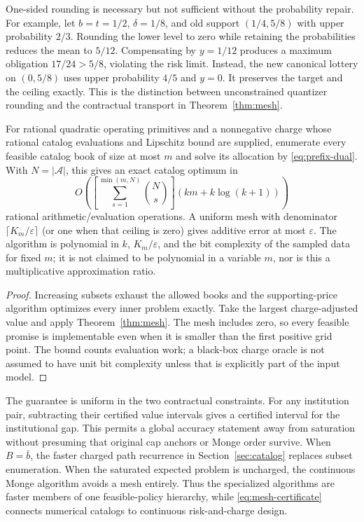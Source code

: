 One-sided rounding is necessary but not sufficient without the probability repair. For example, let $b=t=1/2$, $\delta=1/8$, and old support $(1/4,5/8)$ with upper probability $2/3$. Rounding the lower level to zero while retaining the probabilities reduces the mean to $5/12$. Compensating by $y=1/12$ produces a maximum obligation $17/24>5/8$, violating the risk limit. Instead, the new canonical lottery on $(0,5/8)$ uses upper probability $4/5$ and $y=0$. It preserves the target and the ceiling exactly. This is the distinction between unconstrained quantizer rounding and the contractual transport in Theorem~\ref{thm:mesh}.

\begin{corollary}\label{cor:scheme}
For rational quadratic operating primitives and a nonnegative charge whose rational catalog evaluations and Lipschitz bound are supplied, enumerate every feasible catalog book of size at most $m$ and solve its allocation by \eqref{eq:prefix-dual}. With $N=|\mathcal A|$, this gives an exact catalog optimum in
\begin{equation}\label{eq:catalog-enumeration}
 O\!\left(\left[\sum_{s=1}^{\min(m,N)}{N\choose s}\right]
                (km+k\log(k+1))\right)
\end{equation}
rational arithmetic/evaluation operations. A uniform mesh with denominator $\lceil K_m/\varepsilon\rceil$ (or one when that ceiling is zero) gives additive error at most $\varepsilon$. The algorithm is polynomial in $k$, $K_m/\varepsilon$, and the bit complexity of the sampled data for fixed $m$; it is not claimed to be polynomial in a variable $m$, nor is this a multiplicative approximation ratio.
\end{corollary}
\begin{proof}
Increasing subsets exhaust the allowed books and the supporting-price algorithm optimizes every inner problem exactly. Take the largest charge-adjusted value and apply Theorem~\ref{thm:mesh}. The mesh includes zero, so every feasible promise is implementable even when it is smaller than the first positive grid point. The bound counts evaluation work; a black-box charge oracle is not assumed to have unit bit complexity unless that is explicitly part of the input model.
\end{proof}

The guarantee is uniform in the two contractual constraints. For any institution pair, subtracting their certified value intervals gives a certified interval for the institutional gap. This permits a global accuracy statement away from saturation without presuming that original cap anchors or Monge order survive. When $B=\bar b$, the faster charged path recurrence in Section~\ref{sec:catalog} replaces subset enumeration. When the saturated expected problem is uncharged, the continuous Monge algorithm avoids a mesh entirely. Thus the specialized algorithms are faster members of one feasible-policy hierarchy, while \eqref{eq:mesh-certificate} connects numerical catalogs to continuous risk-and-charge design.
